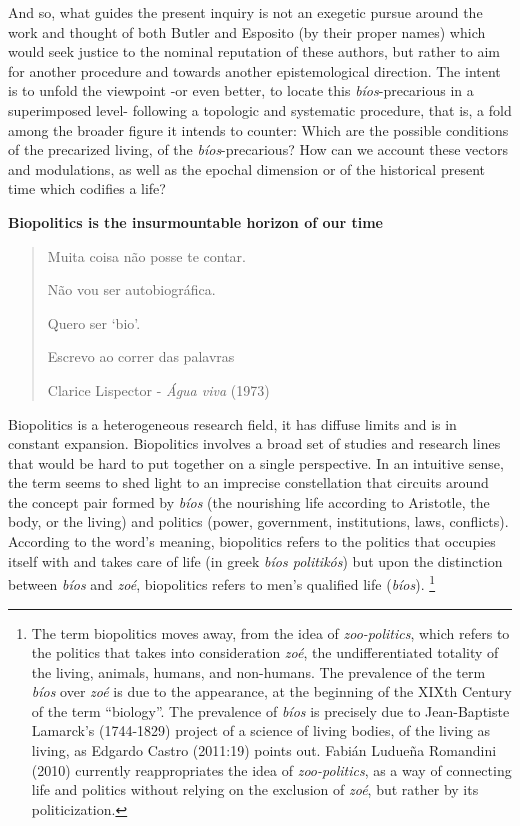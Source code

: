 \documentclass[a4paper,]{scrartcl}
\begin{document}
And so, what guides the present inquiry is not an exegetic pursue around
the work and thought of both Butler and Esposito (by their proper names)
which would seek justice to the nominal reputation of these authors, but
rather to aim for another procedure and towards another epistemological
direction. The intent is to unfold the viewpoint -or even better, to
locate this \emph{bíos}-precarious in a superimposed level- following a
topologic and systematic procedure, that is, a fold among the broader
figure it intends to counter: Which are the possible conditions of the
precarized living, of the \emph{bíos}-precarious? How can we account
these vectors and modulations, as well as the epochal dimension or of
the historical present time which codifies a life?

\textbf{Biopolitics is the insurmountable horizon of our time}

\begin{quote}
Muita coisa não posse te contar.

Não vou ser autobiográfica.

Quero ser `bio'.

Escrevo ao correr das palavras

Clarice Lispector - \emph{Água viva} (1973)
\end{quote}

Biopolitics is a heterogeneous research field, it has diffuse limits and
is in constant expansion. Biopolitics involves a broad set of studies
and research lines that would be hard to put together on a single
perspective. In an intuitive sense, the term seems to shed light to an
imprecise constellation that circuits around the concept pair formed by
\emph{bíos} (the nourishing life according to Aristotle, the body, or
the living) and politics (power, government, institutions, laws,
conflicts). According to the word's meaning, biopolitics refers to the
politics that occupies itself with and takes care of life (in greek
\emph{bíos politikós}) but upon the distinction between \emph{bíos} and
\emph{zoé}, biopolitics refers to men's qualified life (\emph{bíos}).
\footnote{The term biopolitics moves away, from the idea of
  \emph{zoo-politics}, which refers to the politics that takes into
  consideration \emph{zoé}, the undifferentiated totality of the living,
  animals, humans, and non-humans. The prevalence of the term
  \emph{bíos} over \emph{zoé} is due to the appearance, at the beginning
  of the XIXth Century of the term ``biology''. The prevalence of
  \emph{bíos} is precisely due to Jean-Baptiste Lamarck's (1744-1829)
  project of a science of living bodies, of the living as living, as
  Edgardo Castro (2011:19) points out. Fabián Ludueña Romandini (2010)
  currently reappropriates the idea of \emph{zoo-politics}, as a way of
  connecting life and politics without relying on the exclusion of
  \emph{zoé}, but rather by its politicization.}
\end{document}
